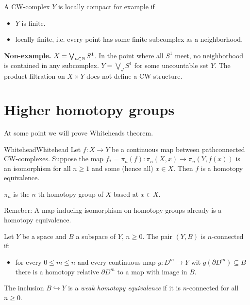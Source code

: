 \documentclass{TemplateLecture}
\begin{document}
\begin{example}
    A CW-complex \(Y\) is locally compact for example if
    \begin{itemize}
        \item \(Y\) is finite.
        \item locally finite, i.e. every point has some finite subcomplex as a neighborhood.
    \end{itemize}
\end{example}

\textbf{Non-example.} \(X = \bigvee_{n \in \mathbb{N}} S^1\). In the point where all \(S^1\) meet, no neighborhood is contained in any subcomplex. \(Y = \bigvee_J S^1\) for some uncountable set \(Y\). The product filtration on \(X \times Y\) does not define a CW-structure.

\section{Higher homotopy groups}

At some point we will prove Whiteheads theorem.

\begin{thm}{Whitehead}{Whitehead}
    Let \(f\colon X\to Y\) be a continuous map between pathconnected CW-complexes. Suppose the map \(f_* = \pi_n(f)\colon \pi_n(X,x) \to \pi_n(Y, f(x))\) is an isomorphism for all \(n \geq 1\) and some (hence all) \(x \in X\).
    Then \(f\) is a homotopy equivalence.
\end{thm}

\(\pi_n\) is the \(n\)-th homotopy group of \(X\) based at \(x \in X\).

Remeber: A map inducing isomorphism on homotopy groups already is a homotopy equivalence.

\begin{defi}{}{}
    Let \(Y\) be a space and \(B\) a subspace of \(Y\), \(n \geq 0\). The pair \((Y,B)\) is \(n\)-connected if:
    \begin{itemize}
        \item for every \(0 \leq m \leq n\) and every continuous map \(g\colon D^m \to Y\) wit \(g(\partial D^m) \subseteq B\) there is a homotopy relative \(\partial D^m\) to a map with image in \(B\).
    \end{itemize}

    The inclusion \(B \hookrightarrow Y\) is a \emph{weak homotopy equivalence} if it is \(n\)-connected for all \(n \geq 0\).
\end{defi}
\end{document}
